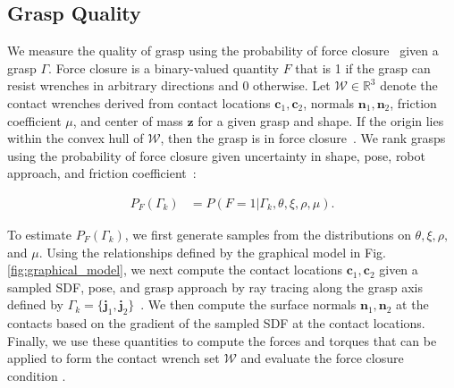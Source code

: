 \documentclass[10pt, conference]{ieeeconf}      %
\newcommand{\bc}{\mathbf{c}}
\newcommand{\bj}{\mathbf{j}}
\newcommand{\bn}{\mathbf{n}}
\newcommand{\bz}{\mathbf{z}}
\newcommand{\mW}{\mathcal{W}}
\begin{document}
 
\subsection{Grasp Quality}\label{sec:grasp_sample}
We measure the quality of grasp using the probability of force closure~\cite{kehoe2012estimating, kehoe2012toward, kim2012physically,weisz2012pose} given a grasp $\Gamma$. Force closure is a binary-valued quantity $F$ that is 1 if the grasp can resist wrenches in arbitrary directions and 0 otherwise.
Let $\mW \in \mathbb{R}^3$ denote the contact wrenches derived from contact locations $\bc_1,\bc_2$, normals $\bn_1,\bn_2$, friction coefficient $\mu$, and center of mass $\bz$ for a given grasp and shape.
If the origin lies within the convex hull of $\mW$, then the grasp is in force closure~\cite{li1988task}.
We rank grasps using the probability of force closure given uncertainty in shape, pose, robot approach, and friction coefficient~\cite{christopoulos2007handling, kehoe2012toward}:

\vspace{-2ex}
\begin{align*}
	P_F(\Gamma_k) &= P \left(F = 1 | \Gamma_k, \theta, \xi, \rho, \mu \right).
\end{align*}
 
To estimate $P_F(\Gamma_k)$, we first generate samples from the distributions on $\theta, \xi, \rho,$ and $\mu$.
Using the relationships defined by the graphical model in Fig. \ref{fig:graphical_model}, we next compute the contact locations $\bc_1, \bc_2$ given a sampled SDF, pose, and grasp approach by ray tracing along the grasp axis defined by $\Gamma_k = \lbrace \bj_1,\bj_2 \rbrace$~\cite{newcombe2011kinectfusion}.
We then compute the surface normals $\bn_1, \bn_2$ at the contacts based on the gradient of the sampled SDF at the contact locations.
Finally, we use these quantities to compute the forces and torques that can be applied to form the contact wrench set $\mW$ and evaluate the force closure condition \cite{li1988task}.

%
%
% 
\end{document}
